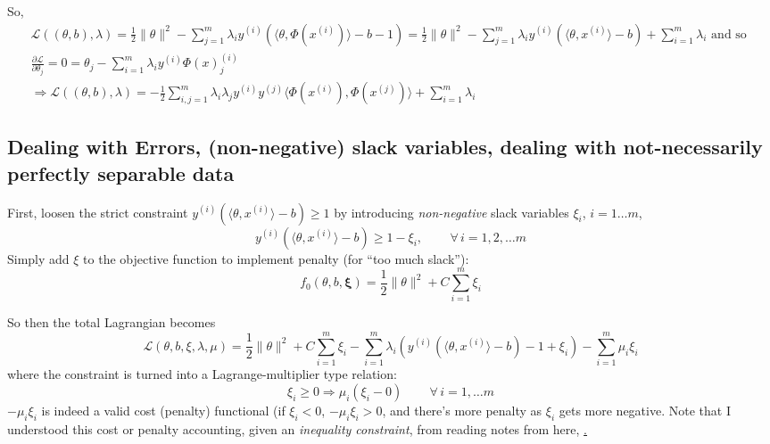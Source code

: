 \documentclass[10pt]{amsart}
\begin{document}
\begin{multicols*}{2}
So,
\begin{equation}
  \begin{gathered}
    \mathcal{L}((\theta,b),\lambda) = \frac{1}{2} \| \theta\|^2 - \sum_{j=1}^m \lambda_i y^{(i)}(\langle \theta, \Phi(x^{(i)}) \rangle - b - 1)   =  \frac{1}{2} \| \theta\|^2 - \sum_{j=1}^m \lambda_i y^{(i)}(\langle \theta, x^{(i)} \rangle - b) +\sum_{i=1}^m \lambda_i \text{ and so } \\
    \frac{ \partial \mathcal{L}}{ \partial \theta_j} = 0 = \theta_j - \sum_{i=1}^m \lambda_i y^{(i)} \Phi(x)^{(i)}_j \\
    \Longrightarrow \mathcal{L}((\theta,b),\lambda) = -\frac{1}{2} \sum_{i,j=1}^m \lambda_i \lambda_j y^{(i)} y^{(j)} \langle \Phi(x^{(i)}) , \Phi(x^{(j)}) \rangle + \sum_{i=1}^m \lambda_i
    \end{gathered}
  \end{equation}

\subsection{Dealing with Errors, (non-negative) slack variables, dealing with not-necessarily perfectly separable data}

First, loosen the strict constraint $y^{(i)}(\langle \theta,x^{(i)} \rangle - b) \geq 1$ by introducing \emph{non-negative} slack variables $\xi_i$, $i=1\dots m$,
\begin{equation}
  y^{(i)}(\langle \theta, x^{(i)} \rangle - b) \geq 1 - \xi_i, \qquad \, \forall \, i = 1,2, \dots m 
\end{equation}
Simply add $\xi$ to the objective function to implement penalty (for ``too much slack''):
\begin{equation}
  f_0(\theta,b,\mathbf{\xi}) = \frac{1}{2} \| \theta \|^2 + C\sum_{i=1}^m \xi_i
  \end{equation}



So then the total Lagrangian becomes
\begin{equation}
  \mathcal{L}(\theta,b,\xi,\lambda,\mu) = \frac{1}{2} \| \theta \|^2 + C\sum_{i=1}^m \xi_i - \sum_{i=1}^m \lambda_i (y^{(i)}(\langle \theta,x^{(i)} \rangle -b)-1 +\xi_i ) - \sum_{i=1}^m \mu_i \xi_i
\end{equation}
where the constraint is turned into a Lagrange-multiplier type relation:
\begin{equation}
\xi_i \geq 0 \Longrightarrow \mu_i(\xi_i - 0) \qquad \, \forall \, i =1,\dots m 
\end{equation}
$-\mu_i\xi_i$ is indeed a valid cost (penalty) functional (if $\xi_i  <0$, $-\mu_i\xi_i >0$, and there's more penalty as $\xi_i$ gets more negative.  Note that I understood this cost or penalty accounting, given an \emph{inequality constraint}, from reading notes from here, \href{http://www.pitt.edu/~jrclass/opt/notes4.pdf}.   









\end{multicols*}
\end{document}
